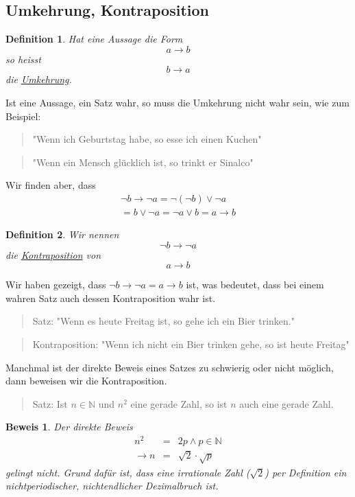 \documentclass{report}
\newtheorem{mydef}{Definition}
\newtheorem{myproof}{Beweis}
\begin{document}
\subsection{Umkehrung, Kontraposition}
\begin{mydef}Hat eine Aussage die Form
\begin{equation}a \to b\end{equation}
so heisst
\begin{equation}b \to a\end{equation}
die \underline{Umkehrung}.
\end{mydef}
Ist eine Aussage, ein Satz wahr, so muss die Umkehrung nicht wahr sein, wie zum Beispiel:
\begin{quote}"Wenn ich Geburtstag habe, so esse ich einen Kuchen"\end{quote}
\begin{quote}"Wenn ein Mensch glücklich ist, so trinkt er Sinalco"\end{quote}
Wir finden aber, dass
\begin{eqnarray}\lnot b \to \lnot a = \lnot(\lnot b) \lor \lnot a \nonumber\\
= b \lor \lnot a = \lnot a \lor b = a \to b\end{eqnarray}
\begin{mydef}Wir nennen
\begin{equation}\lnot b \to \lnot a\end{equation}
die \underline{Kontraposition} von
\begin{equation}a \to b\end{equation}
\end{mydef}
Wir haben gezeigt, dass $\lnot b \to \lnot a = a \to b$ ist, was bedeutet, dass bei einem wahren Satz auch dessen Kontraposition wahr ist.
\begin{quote}{Satz}: "Wenn es heute Freitag ist, so gehe ich ein Bier trinken."\end{quote}
\begin{quote}{Kontraposition}: "Wenn ich nicht ein Bier trinken gehe, so ist heute Freitag"\end{quote}
Manchmal ist der direkte Beweis eines Satzes zu schwierig oder nicht möglich, dann beweisen wir die Kontraposition.
\begin{quote}{Satz}: Ist $n \in \mathbb{N}$ und $n^2$ eine gerade Zahl, so ist $n$ auch eine gerade Zahl.\end{quote}
\begin{myproof}Der direkte Beweis
\begin{eqnarray}n^2 &=& 2p \land p \in \mathbb{N} \nonumber \\
\to n &=& \sqrt{2} \cdot \sqrt{p}\end{eqnarray}
gelingt nicht. Grund dafür ist, dass eine irrationale Zahl ($\sqrt{2}$) per Definition ein nichtperiodischer, nichtendlicher Dezimalbruch ist.\end{myproof}
\end{document}
